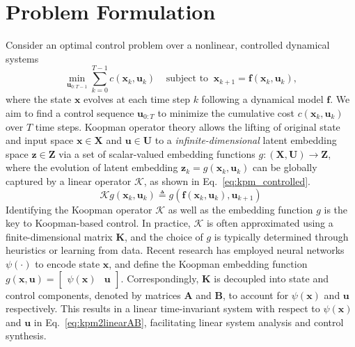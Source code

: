 \documentclass{article}
\begin{document}
\section{Problem Formulation}
Consider an optimal control problem over a nonlinear, controlled dynamical systems 
\begin{equation}
    \min _{\mathbf{u}_{0: T-1}} \textstyle \sum_{k=0}^{T-1} c\left(\mathbf{x}_k, \mathbf{u}_k\right) \;\;\;\; \text{subject to} \;\;
    \mathbf{x}_{k+1}=\mathbf{f}\left(\mathbf{x}_k, \mathbf{u}_k\right),
\end{equation} where the state $\mathbf{x}$  evolves at each time step $k$ following a dynamical model $\mathbf{f}$. We aim to find a control sequence $\mathbf{u}_{0:T}$ to minimize the cumulative cost $c(\mathbf{x}_k, \mathbf{u}_k)$ over $T$ time steps.
Koopman operator theory \cite{koopman1931hamiltonian, proctor2016dynamic} allows the lifting of original state and input space $\mathbf{x} \in {\mathbf{X}}$ and $\mathbf{u} \in \mathbf{U}$ to a \textit{infinite-dimensional} latent embedding space $\mathbf{z} \in {\mathbf{Z}}$ via a set of scalar-valued embedding functions $g: \mathbf{(X, U)} \rightarrow \mathbf{Z}$, where the evolution of latent embedding $\mathbf{z}_k = g(\mathbf{x}_k, \mathbf{u}_k)$ can be globally captured by a linear operator $\mathcal{K}$, 
as shown in Eq.~\eqref{eq:kpm_controlled}. 
\begin{equation}
\mathcal{K} g\left(\mathbf{x}_k, \mathbf{u}_k\right) \triangleq g\left(\mathbf{f}\left(\mathbf{x}_k, \mathbf{u}_k\right), \mathbf{u}_{k+1}\right)
\label{eq:kpm_controlled}
\end{equation}
Identifying the Koopman operator $\mathcal{K}$ as well as the embedding function $g$ is the key to Koopman-based control. In practice, $\mathcal{K}$ is often approximated using a finite-dimensional matrix $\mathbf{K}$, and the choice of $g$ is typically determined through heuristics or learning from data.
%
Recent research \cite{han2020deep, shi2022deep} has employed neural networks $\psi(\cdot)$ to encode state $\mathbf{x}$, and define the Koopman embedding function $g(\mathbf{x}, \mathbf{u}) = \begin{bmatrix} \psi(\mathbf{x})&\mathbf{u} \end{bmatrix}$. Correspondingly, $\mathbf{K}$ is decoupled into state and control components, denoted by matrices $\mathbf{A}$ and $\mathbf{B}$, to account for $\psi(\mathbf{x})$ and  $\mathbf{u}$ respectively. 
This results in a linear time-invariant system with respect to $\psi(\mathbf{x})$ and $\mathbf{u}$ in Eq.~\eqref{eq:kpm2linearAB}, facilitating linear system analysis and control synthesis. 
\end{document}
